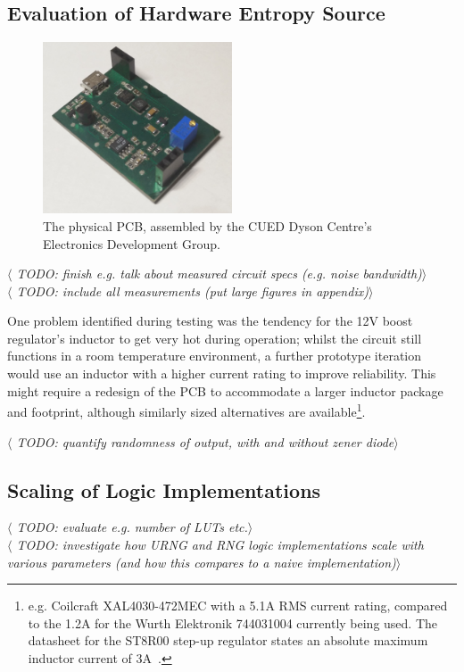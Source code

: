 \documentclass[12pt]{article}
\begin{document}
  \subsection{Evaluation of Hardware Entropy Source}
    \begin{figure}[H]
      \centering
      \includegraphics[width=0.5\textwidth]{fig/PCB_CROPPED.jpg}
      \caption{The physical PCB, assembled by the CUED Dyson Centre's Electronics Development Group.}
      \label{fig:pcb_cropped}
    \end{figure}

    \textit{$\langle$ TODO: finish e.g. talk about measured circuit specs (e.g. noise bandwidth)$\rangle$}\\
    \textit{$\langle$ TODO: include all measurements (put large figures in appendix)$\rangle$}

    One problem identified during testing was the tendency for the 12V boost regulator's inductor to get very hot during operation; whilst the circuit still functions in a room temperature environment, a further prototype iteration would use an inductor with a higher current rating to improve reliability. This might require a redesign of the PCB to accommodate a larger inductor package and footprint, although similarly sized alternatives are available\footnote{e.g. Coilcraft XAL4030-472MEC with a 5.1A RMS current rating, compared to the 1.2A for the Wurth Elektronik 744031004 currently being used. The datasheet for the ST8R00 step-up regulator states an absolute maximum inductor current of 3A~\cite{ST8R00}.}.

    \textit{$\langle$ TODO: quantify randomness of output, with and without zener diode$\rangle$}




  \subsection{Scaling of Logic Implementations}
    \textit{$\langle$ TODO: evaluate e.g. number of LUTs etc.$\rangle$}\\
    \textit{$\langle$ TODO: investigate how URNG and RNG logic implementations scale with various parameters (and how this compares to a naive implementation)$\rangle$}\\
\end{document}
